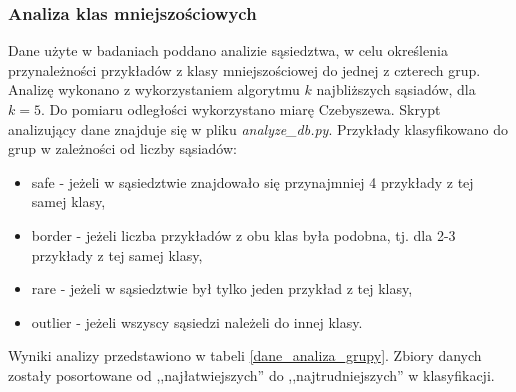 \subsubsection{Analiza klas mniejszościowych}
Dane użyte w badaniach poddano analizie sąsiedztwa, w celu określenia przynależności przykładów z klasy mniejszościowej do jednej z czterech grup. Analizę wykonano z wykorzystaniem algorytmu $k$ najbliższych sąsiadów, dla $k = 5$. Do pomiaru odległości wykorzystano miarę Czebyszewa. Skrypt analizujący dane znajduje się w pliku \textit{analyze\_db.py}. Przykłady klasyfikowano do grup w zależności od liczby sąsiadów\cite{przykladyklas}:
\begin{itemize}
	\item safe - jeżeli w sąsiedztwie znajdowało się przynajmniej 4 przykłady z tej samej klasy,
	\item border - jeżeli liczba przykładów z obu klas była podobna, tj. dla 2-3 przykłady z tej samej klasy,
	\item rare - jeżeli w sąsiedztwie był tylko jeden przykład z tej klasy,
	\item outlier - jeżeli wszyscy sąsiedzi należeli do innej klasy.
\end{itemize}
Wyniki analizy przedstawiono w tabeli \ref{dane_analiza_grupy}. Zbiory danych zostały posortowane od ,,najłatwiejszych'' do ,,najtrudniejszych'' w klasyfikacji.
\newpage
